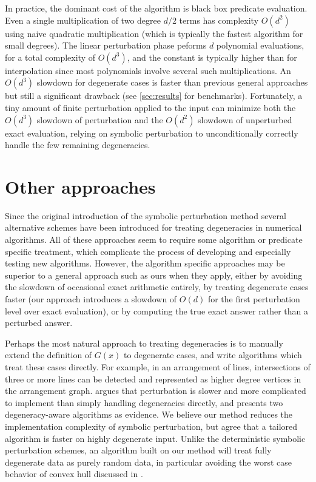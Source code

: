 \documentclass[11pt]{article}
\begin{document}
In practice, the dominant cost of the algorithm is black box predicate evaluation.  Even a single multiplication of two degree $d/2$ terms has complexity $O(d^2)$ using naive
quadratic multiplication (which is typically the fastest algorithm for small degrees).  The linear perturbation phase peforms $d$ polynomial evaluations, for a total
complexity of $O(d^3)$, and the constant is typically higher than for interpolation since most polynomials involve several such multiplications.  An $O(d^3)$ slowdown for degenerate
cases is faster than previous general approaches but still a significant drawback (see \autoref{sec:results} for benchmarks).  Fortunately, a tiny amount of finite perturbation
applied to the input can minimize both the $O(d^3)$ slowdown of perturbation and the $O(d^2)$ slowdown of unperturbed exact evaluation, relying on symbolic perturbation to
unconditionally correctly handle the few remaining degeneracies.

\section{Other approaches}

Since the original introduction of the symbolic perturbation method several alternative schemes have been introduced for treating degeneracies in numerical algorithms.
All of these approaches seem to require some algorithm or predicate specific treatment, which complicate the process of developing and especially testing new algorithms.
However, the algorithm specific approaches may be superior to a general approach such as ours when they apply, either by avoiding the slowdown of occasional exact arithmetic
entirely, by treating degenerate cases faster (our approach introduces a slowdown of $O(d)$ for the first perturbation level over exact evaluation), or by computing the true exact
answer rather than a perturbed answer.

Perhaps the most natural approach to treating degeneracies is to manually extend the definition of $G(x)$ to degenerate cases, and write algorithms which treat these cases
directly.  For example, in an arrangement of lines, intersections of three or more lines can be detected and represented as higher degree vertices in the arrangement graph.
\cite{burnikel1994degeneracy} argues that perturbation is slower and more complicated to implement than simply handling degeneracies directly, and presents two degeneracy-aware
algorithms as evidence.  We believe our method reduces the implementation complexity of symbolic perturbation, but agree that a tailored algorithm is faster on highly
degenerate input.  Unlike the deterministic symbolic perturbation schemes, an algorithm built on our method will treat fully degenerate data as purely random data, in particular
avoiding the worst case behavior of convex hull discussed in \cite{burnikel1994degeneracy}.
\end{document}
